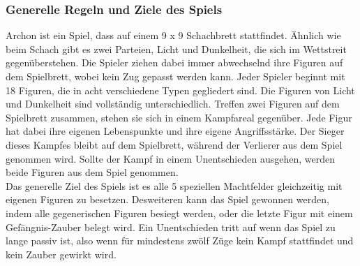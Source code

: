 \subsubsection{Generelle Regeln und Ziele des Spiels}
Archon ist ein Spiel, dass auf einem 9 x 9 Schachbrett stattfindet. Ähnlich wie beim Schach gibt es zwei Parteien, Licht und Dunkelheit, die sich im Wettstreit gegenüberstehen.
Die Spieler ziehen dabei immer abwechselnd ihre Figuren auf dem Spielbrett, wobei kein Zug gepasst werden kann. Jeder Spieler beginnt mit 18 Figuren, die in acht verschiedene Typen gegliedert sind. Die Figuren von Licht und Dunkelheit sind vollständig unterschiedlich. Treffen zwei Figuren auf dem Spielbrett zusammen, stehen sie sich in einem Kampfareal gegenüber. Jede Figur hat dabei ihre eigenen Lebenspunkte und ihre eigene Angriffsstärke. Der Sieger dieses Kampfes bleibt auf dem Spielbrett, während der Verlierer aus dem Spiel genommen wird. Sollte der Kampf in einem Unentschieden ausgehen, werden beide Figuren aus dem Spiel genommen.
\\Das generelle Ziel des Spiels ist es alle 5 speziellen Machtfelder gleichzeitig mit eigenen Figuren zu besetzen.
Desweiteren kann das Spiel gewonnen werden, indem alle gegenerischen Figuren besiegt werden, oder die letzte Figur mit einem Gefängnis-Zauber belegt wird.
Ein Unentschieden tritt auf wenn das Spiel zu lange passiv ist, also wenn für mindestens zwölf Züge kein Kampf stattfindet und kein Zauber gewirkt wird.
